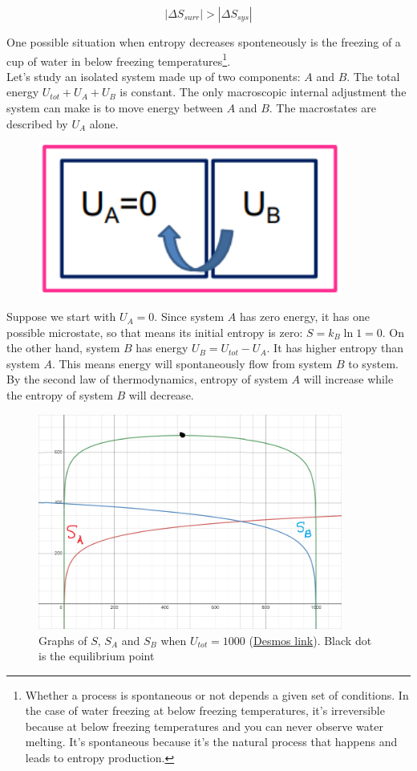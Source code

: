 \[\left|\Delta S_{surr}\right| > \left|\Delta S_{sys}\right|\]

One possible situation when entropy decreases sponteneously is the freezing of a cup of water in below freezing temperatures\footnote{Whether a process is spontaneous or not depends a given set of conditions. In the case of water freezing at below freezing temperatures, it’s irreversible because at below freezing temperatures and you can never observe water melting. It’s spontaneous because it’s the natural process that happens and leads to entropy production.}. \\

Let's study an isolated system made up of two components: $A$ and $B$. The total energy $U_{tot}+U_A+U_B$ is constant. The only macroscopic internal adjustment the system can make is to move energy between $A$ and $B$. The macrostates are described by $U_A$ alone.

\begin{figure}[H]
	\centering
	\includegraphics[width=100mm]{32.png}
\end{figure}

Suppose we start with $U_A=0$. Since system $A$ has zero energy, it has one possible microstate, so that means its initial entropy is zero: $S=k_B\ln1=0$. On the other hand, system $B$ has energy $U_B=U_{tot}-U_A$. It has higher entropy than system $A$. This means energy will spontaneously flow from system $B$ to system. By the second law of thermodynamics, entropy of system $A$ will increase while the entropy of system $B$ will decrease.

\begin{figure}[H]
	\centering
	\includegraphics[width=100mm]{33.png}
	\caption{Graphs of $S$, $S_A$ and $S_B$ when $U_{tot}=1000$ (\href{https://www.desmos.com/calculator/px64pose4a}{Desmos link}). Black dot is the equilibrium point}
\end{figure}


